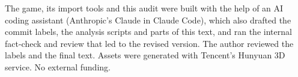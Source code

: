 The game, its import tools and this audit were built with the help of an AI
coding assistant (Anthropic's Claude in Claude Code), which also drafted the
commit labels, the analysis scripts and parts of this text, and ran the internal
fact-check and review that led to the revised version. The author reviewed the
labels and the final text. Assets were generated with Tencent's Hunyuan 3D
service. No external funding.
